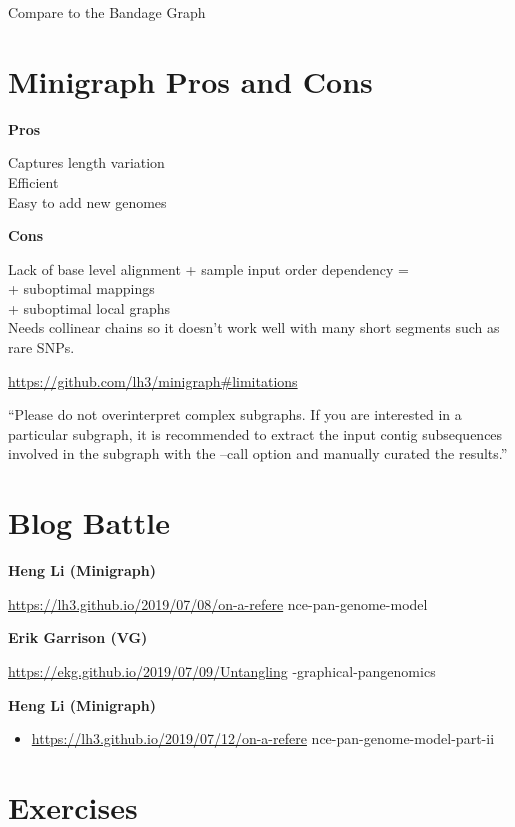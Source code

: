 \documentclass[
]{book}
\providecommand{\tightlist}{%
  \setlength{\itemsep}{0pt}\setlength{\parskip}{0pt}}
\begin{document}
Compare to the Bandage Graph

\hypertarget{minigraph-pros-and-cons}{%
\section{Minigraph Pros and Cons}\label{minigraph-pros-and-cons}}

\textbf{Pros}

Captures length variation\\
Efficient\\
Easy to add new genomes

\textbf{Cons}

Lack of base level alignment + sample input order dependency =\\
+ suboptimal mappings\\
+ suboptimal local graphs\\
Needs collinear chains so it doesn't work well with many short segments such as rare SNPs.

\url{https://github.com/lh3/minigraph\#limitations}

``Please do not overinterpret complex subgraphs. If you are interested in a particular subgraph, it is recommended to extract the input contig subsequences involved in the subgraph with the --call option and manually curated the results.''

\hypertarget{blog-battle}{%
\section{Blog Battle}\label{blog-battle}}

\textbf{Heng Li (Minigraph)}

\url{https://lh3.github.io/2019/07/08/on-a-refere} nce-pan-genome-model

\textbf{Erik Garrison (VG)}

\url{https://ekg.github.io/2019/07/09/Untangling} -graphical-pangenomics

\textbf{Heng Li (Minigraph)}

\begin{itemize}
\tightlist
\item
  \url{https://lh3.github.io/2019/07/12/on-a-refere} nce-pan-genome-model-part-ii
\end{itemize}

\hypertarget{exercises}{%
\section{Exercises}\label{exercises}}
\end{document}
